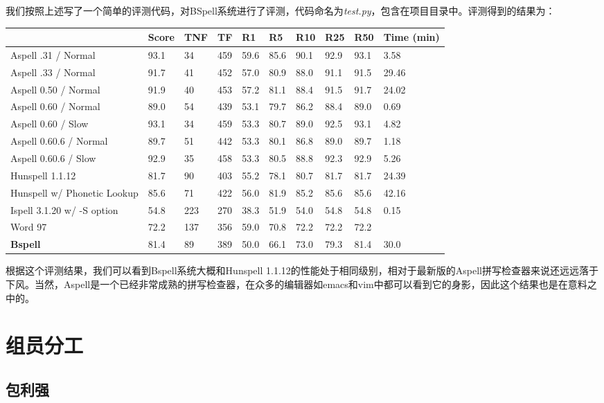 \documentclass[UTF8,a4paper]{ctexart}
\begin{document}
我们按照上述写了一个简单的评测代码，对BSpell系统进行了评测，代码命名为\textit{test.py}，包含在项目目录中。评测得到的结果为：

\begin{table}[hbp]
\centering
    \begin{tabular}{|l|l|l|l|l|l|l|l|l|l|}
    \hline
		~ & Score & TNF & TF & R1 & R5 & R10 & R25 & R50 & Time (min) \\
		\hline
		Aspell .31 / Normal & 93.1 &34 & 459 &59.6 & 85.6 & 90.1 & 92.9 & 93.1 & 3.58 \\
		\hline
		Aspell .33 / Normal		&91.7	&41			&452		&57.0	&80.9	&88.0	&91.1	&91.5 & 29.46 \\
		\hline
		Aspell 0.50 / Normal		&91.9	&40			&453		&57.2	&81.1	&88.4	&91.5	&91.7 & 24.02 \\
		\hline
		Aspell 0.60 / Normal		&89.0	&54			&439		&53.1	&79.7	&86.2	&88.4	&89.0 & 0.69 \\
		\hline
		Aspell 0.60 / Slow		&93.1	&34			&459		&53.3	&80.7	&89.0	&92.5	&93.1 & 4.82 \\
		\hline
		Aspell 0.60.6 / Normal		&89.7	&51			&442		&53.3	&80.1	&86.8	&89.0	&89.7 & 1.18 \\
		\hline
		Aspell 0.60.6 / Slow		&92.9	&35			&458		&53.3	&80.5	&88.8	&92.3	&92.9 & 5.26 \\
		\hline
		Hunspell 1.1.12			&81.7	&90			&403		&55.2	&78.1	&80.7	&81.7	&81.7 & 24.39 \\
		\hline
		Hunspell w/ Phonetic Lookup	&85.6	&71			&422		&56.0	&81.9	&85.2	&85.6	&85.6 & 42.16 \\
		\hline
		Ispell 3.1.20 w/ -S option	&54.8	&223			&270		&38.3	&51.9	&54.0	&54.8	&54.8 & 0.15 \\
		\hline
		Word 97				&72.2	&137			&356		&59.0	&70.8	&72.2	&72.2	&72.2  & ~ \\
		\hline
		\textbf{Bspell}	 &	81.4 & 89 & 389 & 50.0 & 66.1 & 73.0 & 79.3 & 81.4 & 30.0 \\
		\hline
    \end{tabular}
\end{table}

根据这个评测结果，我们可以看到Bspell系统大概和Hunspell 1.1.12的性能处于相同级别，相对于最新版的Aspell拼写检查器来说还远远落于下风。当然，Aspell是一个已经非常成熟的拼写检查器，在众多的编辑器如emacs和vim中都可以看到它的身影，因此这个结果也是在意料之中的。

\section{组员分工}

\subsection{包利强}



\clearpage


\end{document}
